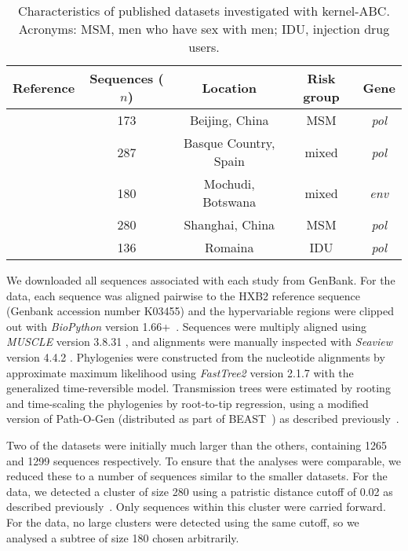 \documentclass[nogrid]{MBE}
\begin{document}
\begin{table*}[!t]
  \centering
  \begin{tabular}{ccccc}
    Reference & Sequences ($n$) & Location & Risk group & Gene \\
    \hline
    \citet{wang2015targeting} & 173 & Beijing, China & MSM & \textit{pol} \\
    \citet{cuevas2009hiv} & 287 & Basque Country, Spain & mixed & \textit{pol} \\
    \citet{novitsky2013phylogenetic} & \multirow{2}{*}{180} &
    \multirow{2}{*}{Mochudi, Botswana} & \multirow{2}{*}{mixed} &
    \multirow{2}{*}{\textit{env}} \\ \citet{novitsky2014impact} \\
    \citet{li2015hiv} & 280 & Shanghai, China & MSM & \textit{pol} \\
    \citet{niculescu2015recent} & 136 & Romaina & IDU & \textit{pol} \\
    \hline
  \end{tabular}
  \caption{Characteristics of published datasets investigated with kernel-ABC.
  Acronyms: MSM, men who have sex with men; IDU, injection drug users.}
  \label{tab:data}
\end{table*}

We downloaded all sequences associated with each study from GenBank. For the
\citet{novitsky2014impact} data, each sequence was aligned pairwise to the HXB2
reference sequence (Genbank accession number K03455) and the hypervariable
regions were clipped out with \textit{BioPython} version
1.66+~\citep{cock2009biopython}. Sequences were multiply aligned using
\textit{MUSCLE} version 3.8.31 \citep{edgar2004muscle}, and alignments were
manually inspected with \textit{Seaview} version 4.4.2
\citep{gouy2010seaview}. Phylogenies were constructed from the nucleotide
alignments by approximate maximum likelihood using \textit{FastTree2} version
2.1.7 with the generalized time-reversible model. Transmission trees were
estimated by rooting and time-scaling the phylogenies by root-to-tip
regression, using a modified version of Path-O-Gen (distributed as part of
BEAST~\citep{drummond2007beast}) as described
previously~\citep{poon2015phylodynamic}. 

Two of the datasets \citep{li2015hiv,novitsky2014impact} were initially much
larger than the others, containing 1265 and 1299 sequences respectively. To
ensure that the analyses were comparable, we reduced these to a number of
sequences similar to the smaller datasets. For the \citet{li2015hiv} data,
we detected a cluster of size 280 using a patristic distance cutoff of 0.02 as
described previously~\citep{poon2015impact}. Only sequences within this
cluster were carried forward. For the \citet{novitsky2014impact} data, no
large clusters were detected using the same cutoff, so we analysed a subtree of
size 180 chosen arbitrarily.
\end{document}
